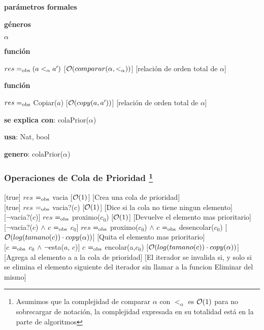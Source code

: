 \begin{Interfaz}
		\textbf{parámetros formales}\parindent\\
 	  \parbox{1.7cm}{\textbf{géneros}} $\alpha$\\	  
	  \parbox[t]{1.7cm}{\textbf{función}}\parbox[t]{\textwidth-2\parindent-1.7cm}{    	
    {$res =_{\mathrm{obs}} (a <_{\alpha} a')$}
    [$\mathcal{O}(comparar(\alpha, <_\alpha))$]
    [relación de orden total de $\alpha$]
    }
    
    	\parbox[t]{1.7cm}{\textbf{función}}\parbox[t]{\textwidth-2\parindent-1.7cm}{    	
    {$res =_{\mathrm{obs}}$ Copiar($a$)}
    [$\mathcal{O}(copy(a, a'))$]
    [relación de orden total de $\alpha$]
    }

  \textbf{se explica con}: colaPrior($\alpha$)

  \textbf{usa}: Nat, bool
  
  \textbf{genero}: colaPrior($\alpha$)


  \subsubsection*{Operaciones de Cola de Prioridad \footnote{Asumimos que la complejidad de comparar $\alpha$ con $<_\alpha$ es $\mathcal{O}(1)$ para no sobrecargar de notación, la complejidad expresada en su totalidad está en la parte de algoritmos}}

  [true]
  {$res$ $=_{\mathrm{obs}}$ vacia}
  [$\mathcal{O}(1)$]
  [Crea una cola de prioridad]\\ 
  
  [true]
  {$res$ $=_{\mathrm{obs}}$ vacia?(c)}
  [$\mathcal{O}(1)$]
  [Dice si la cola no tiene ningun elemento]\\ 

  [$\neg$vacia?($c$)]
  {$res$ $=_{\mathrm{obs}}$ proximo($c_0$)}
  [$\mathcal{O}(1)$]
  [Devuelve el elemento mas prioritario]\\   
  
  [$\neg$vacia?($c$) $\land$ $c$ $=_{\mathrm{obs}}$ $c_0$]
  {$res$ $=_{\mathrm{obs}}$ proximo($c_0$) $\land$ $c$ $=_{\mathrm{obs}}$ desencolar($c_0$)}
  [$\mathcal{O}(log(tamano(c)) \cdot copy(\alpha))$]
  [Quita el elemento mas prioritario]\\   
  
	\newpage  
  [$c$ $=_{\mathrm{obs}}$ $c_0$ $\land$ $\neg$esta($a$, $c$)] %
  {$c$ $=_{\mathrm{obs}}$ encolar(a,$c_0$)}
  [$\mathcal{O}(log(tamano(c)) \cdot copy(\alpha))$]
  [Agrega al elemento a a la cola de prioridad]
  [El iterador se invalida si, y solo si se elimina el elemento siguiente del iterador sin llamar a la funcion Eliminar del mismo]\\ 

\end{Interfaz}


